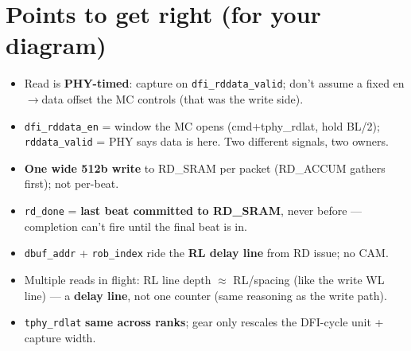\documentclass[10pt]{article}
\begin{document}
\section{Points to get right (for your diagram)}
\begin{itemize}
\item Read is \textbf{PHY-timed}: capture on \texttt{dfi\_rddata\_valid}; don't assume a fixed en$\to$data
      offset the MC controls (that was the write side).
\item \texttt{dfi\_rddata\_en} = window the MC opens (cmd+tphy\_rdlat, hold BL/2); \texttt{rddata\_valid}
      = PHY says data is here. Two different signals, two owners.
\item \textbf{One wide 512b write} to RD\_SRAM per packet (RD\_ACCUM gathers first); not per-beat.
\item \texttt{rd\_done} = \textbf{last beat committed to RD\_SRAM}, never before --- completion can't fire
      until the final beat is in.
\item \texttt{dbuf\_addr} + \texttt{rob\_index} ride the \textbf{RL delay line} from RD issue; no CAM.
\item Multiple reads in flight: RL line depth $\approx$ RL/spacing (like the write WL line) --- a
      \textbf{delay line}, not one counter (same reasoning as the write path).
\item \texttt{tphy\_rdlat} \textbf{same across ranks}; gear only rescales the DFI-cycle unit + capture width.
\end{itemize}
\end{document}
